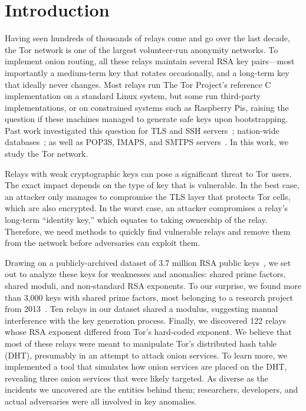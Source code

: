 \section{Introduction}
Having seen hundreds of thousands of relays come and go over the last decade,
the Tor network is one of the largest volunteer-run anonymity networks.  To
implement onion routing, all these relays maintain several RSA key pairs---most
importantly a medium-term key that rotates occasionally, and a long-term key
that ideally never changes.  Most relays run The Tor Project's reference
C implementation on a standard Linux system, but some run third-party
implementations, or on constrained systems such as Raspberry Pis, raising the
question if these machines managed to generate safe keys upon bootstrapping.
Past work investigated this question for TLS and SSH
servers~\cite{Heninger2012a}; nation-wide databases~\cite{Bernstein2013a}; as
well as POP3S, IMAPS, and SMTPS servers~\cite{Hastings2016a}.  In this work, we
study the Tor network.

Relays with weak cryptographic keys can pose a significant threat to Tor users.
The exact impact depends on the type of key that is vulnerable.  In the best
case, an attacker only manages to compromise the TLS layer that protects Tor
cells, which are also encrypted.  In the worst case, an attacker compromises a
relay's long-term ``identity key,'' which equates to taking ownership of the relay.
Therefore, we need methods to quickly find vulnerable relays and remove them
from the network before adversaries can exploit them.

Drawing on a publicly-archived dataset of 3.7 million RSA public
keys~\cite{collector}, we set out to analyze these keys for weaknesses and
anomalies: shared prime factors, shared moduli, and non-standard RSA exponents.
To our surprise, we found more than 3,000 keys with shared prime factors, most
belonging to a research project from 2013~\cite{Biryukov2013a}.  Ten relays in
our dataset shared a modulus, suggesting manual interference with the key
generation process.  Finally, we discovered 122 relays whose RSA exponent
differed from Tor's hard-coded exponent.  We believe that most of these relays
were meant to manipulate Tor's distributed hash table (DHT), presumably in an
attempt to attack onion services.  To learn more, we implemented a tool that
simulates how onion services are placed on the DHT, revealing three onion
services that were likely targeted.  As diverse as the incidents we uncovered
are the entities behind them; researchers, developers, and actual adversaries
were all involved in key anomalies.

